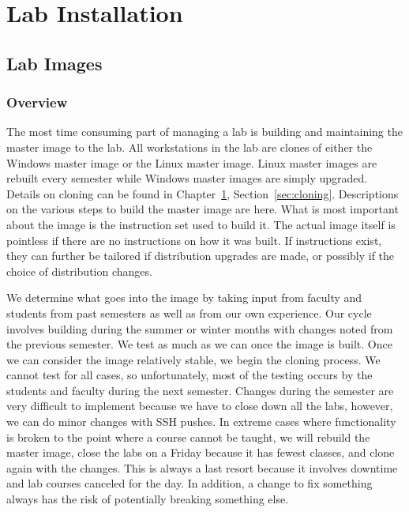 \chapter{Lab Installation} \label{ch:lab_install}
\section{Lab Images} \label{sec:lab_images}
\subsection{Overview}
The most time consuming part of managing a lab is building and maintaining the master image to the lab.  All workstations in the lab are clones of either the Windows master image or the Linux master image.  Linux master images are rebuilt every semester while Windows master images are simply upgraded.  Details on cloning can be found in Chapter~\ref{ch:lab_install}, Section~\ref{sec:cloning}.  Descriptions on the various steps to build the master image are here.  What is most important about the image is the instruction set used to build it.  The actual image itself is pointless if there are no instructions on how it was built.  If instructions exist, they can further be tailored if distribution upgrades are made, or possibly if the choice of distribution changes.  

We determine what goes into the image by taking input from faculty and students from past semesters as well as from our own experience.  Our cycle involves building during the summer or winter months with changes noted from the previous semester.  We test as much as we can once the image is built.  Once we can consider the image relatively stable, we begin the cloning process.  We cannot test for all cases, so unfortunately, most of the testing occurs by the students and faculty during the next semester.  Changes during the semester are very difficult to implement because we have to close down all the labs, however, we can do minor changes with SSH pushes.  In extreme cases where functionality is broken to the point where a course cannot be taught, we will rebuild the master image, close the labs on a Friday because it has fewest classes, and clone again with the changes.  This is always a last resort because it involves downtime and lab courses canceled for the day.  In addition, a change to fix something always has the risk of potentially breaking something else.  


